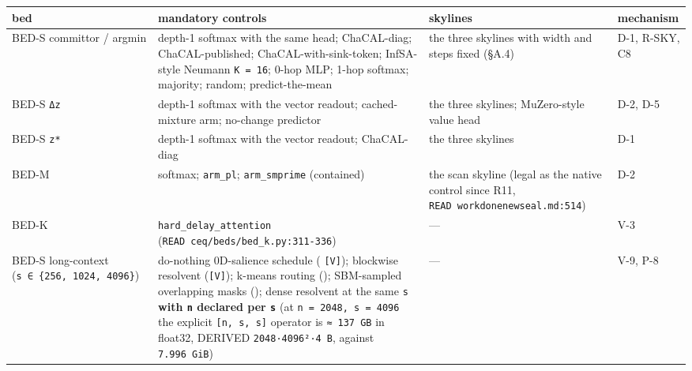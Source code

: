 \documentclass[11pt,a4paper]{article}
\newcounter{none}                 %
\theoremstyle{plain}
\theoremstyle{definition}
\theoremstyle{remark}
\begin{document}
{\def\LTcaptype{none} %
\begin{longtable}[]{@{}
  >{\raggedright\arraybackslash}p{}
  >{\raggedright\arraybackslash}p{}
  >{\raggedright\arraybackslash}p{}
  >{\raggedright\arraybackslash}p{}@{}}
\toprule\noalign{}
\begin{minipage}[b]{\linewidth}\raggedright
bed
\end{minipage} & \begin{minipage}[b]{\linewidth}\raggedright
mandatory controls
\end{minipage} & \begin{minipage}[b]{\linewidth}\raggedright
skylines
\end{minipage} & \begin{minipage}[b]{\linewidth}\raggedright
mechanism
\end{minipage} \\
\midrule\noalign{}
\endhead
\bottomrule\noalign{}
\endlastfoot
BED-S committor / argmin & depth-1 softmax with the same head;
ChaCAL-diag; ChaCAL-published; ChaCAL-with-sink-token; InfSA-style
Neumann \texttt{K\ =\ 16}; 0-hop MLP; 1-hop softmax; majority; random;
predict-the-mean & the three skylines with width and steps fixed (§A.4)
& D-1, R-SKY, C8 \\
BED-S \texttt{Δz} & depth-1 softmax with the vector readout;
cached-mixture arm; no-change predictor & the three skylines;
MuZero-style value head & D-2, D-5 \\
BED-S \texttt{z*} & depth-1 softmax with the vector readout; ChaCAL-diag
& the three skylines & D-1 \\
BED-M & softmax; \texttt{arm\_pl}; \texttt{arm\_smprime} (contained) &
the scan skyline (legal as the native control since R11,
\texttt{READ\ workdonenewseal.md:514}) & D-2 \\
BED-K & \texttt{hard\_delay\_attention}
(\texttt{READ\ ceq/beds/bed\_k.py:311-336}) & --- & V-3 \\
BED-S long-context (\texttt{s\ ∈\ \{256,\ 1024,\ 4096\}}) & do-nothing
0D-salience schedule (\citep{sharma-2026-kernels-22} \texttt{{[}V{]}});
\citep{zhao-2026-structuredsparse} blockwise resolvent
(\texttt{{[}V{]}}); k-means routing
(\citep{roy-2021-routing-transformer}); SBM-sampled overlapping masks
(\citep{cho-2022-sbm-attention}); dense resolvent at the same \texttt{s}
\textbf{with \texttt{n} declared per \texttt{s}} (at
\texttt{n\ =\ 2048,\ s\ =\ 4096} the explicit \texttt{{[}n,\ s,\ s{]}}
operator is \texttt{≈\ 137\ GB} in float32, DERIVED
\texttt{2048·4096²·4\ B}, against \texttt{7.996\ GiB}) & --- & V-9,
P-8 \\
\end{longtable}
}
\end{document}

